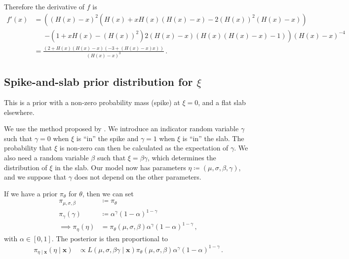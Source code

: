 \documentclass{article}
\begin{document}
%
Therefore the derivative of $f$ is
%
\begin{align*}
	f'(x) &= \left(\left(H(x) - x\right) ^ 2
		\left(H(x) + x H(x) \left(H(x) - x \right)
		- 2 (H(x)) ^ 2 \left(H(x) - x \right)\right)\right. \\
	&\ \phantom{=} \left. - \left(1 + x H(x) - (H(x)) ^ 2\right)
		2 \left(H(x) - x\right)
		\left(H(x) \left(H(x) - x \right) - 1\right)\right)
		\left(H(x) - x\right) ^ {-4} \\
	&= \frac{(2 + H(x) (H(x) - x) (-3 + (H(x) - x) x))}{(H(x) - x) ^ 3} \,.
\end{align*}
%
\subsection{Spike-and-slab prior distribution for \boldmath$\xi$}
\label{appendix:prior-ss}
%

%
This is a prior with a non-zero probability mass (spike) at $\xi = 0$,
and a flat slab elsewhere.
%

%
We use the method proposed by \cite{kuo1998}.
We introduce an indicator random variable $\gamma$ such that
$\gamma = 0$ when $\xi$ is ``in'' the spike
and $\gamma = 1$ when $\xi$ is ``in'' the slab.
The probability that $\xi$ is non-zero can then be calculated
as the expectation of $\gamma$.
We also need a random variable $\beta$ such that $\xi = \beta \gamma$,
which determines the distribution of $\xi$ in the slab.
Our model now has parameters $\eta \coloneqq (\mu, \sigma, \beta, \gamma)$,
and we suppose that $\gamma$ does not depend on the other parameters.
%

%
If we have a prior $\pi_\theta$ for $\theta$, then we can set
%
\begin{align*}
	\pi_{\mu, \sigma, \beta} &\coloneqq \pi_\theta \\
	\pi_\gamma(\gamma)
		&\coloneqq \alpha ^ \gamma (1 - \alpha) ^ {1 - \gamma} \\
	\implies \pi_{\eta}(\eta)
		&= \pi_\theta(\mu, \sigma, \beta)
		\alpha ^ \gamma (1 - \alpha) ^ {1 - \gamma} \,,
\end{align*}
%
with $\alpha \in [0, 1]$. The posterior is then proportional to
%
\begin{align*}
	\pi_{\eta \mid \mathbf{x}}(\eta \mid \mathbf{x}) &\propto
		L(\mu, \sigma, \beta \gamma \mid \mathbf{x})
		\pi_\theta(\mu, \sigma, \beta)
		\alpha ^ \gamma (1 - \alpha) ^ {1 - \gamma} \,.
\end{align*}
%
\end{document}
